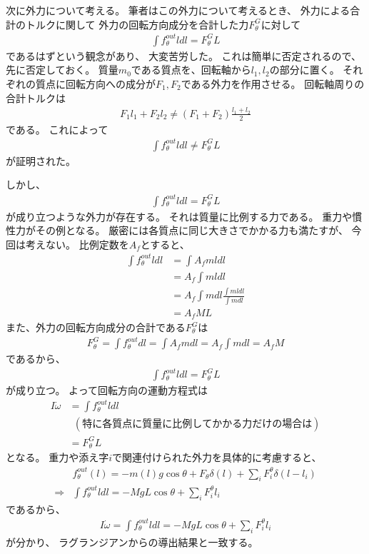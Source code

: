 \documentclass[a4paper,11pt]{jsarticle}
\begin{document}
次に外力について考える。
筆者はこの外力について考えるとき、
外力による合計のトルクに関して
外力の回転方向成分を合計した力$F_\theta^G$に対して
\begin{align}
  \int f_\theta^{out} l dl = F_\theta^G L
\end{align}
であるはずという観念があり、
大変苦労した。
これは簡単に否定されるので、
先に否定しておく。
質量$m_0$である質点を、回転軸から$l_1, l_2$の部分に置く。
それぞれの質点に回転方向への成分が$F_1, F_2$である外力を作用させる。
回転軸周りの合計トルクは
\begin{align}
  F_1 l_1 + F_2 l_2
  \neq
  (F_1 + F_2) \frac{l_1 + l_2}{2}
\end{align}
である。
これによって
\begin{align}
  \int f_\theta^{out} l dl \neq F_\theta^G L
\end{align}
が証明された。

しかし、
\begin{align}
  \int f_\theta^{out} l dl = F_\theta^G L
\end{align}
が成り立つような外力が存在する。
それは質量に比例する力である。
重力や慣性力がその例となる。
厳密には各質点に同じ大きさでかかる力も満たすが、
今回は考えない。
比例定数を$A_f$とすると、
\begin{align}
  \int f_\theta^{out} l dl
  &= \int A_f m l dl
  \\
  &= A_f \int m l dl
  \\
  &= A_f \int m dl \frac{\int mldl}{\int mdl}
  \\
  &= A_f M L
\end{align}
また、外力の回転方向成分の合計である$F_\theta^G$は
\begin{align}
  F_\theta^G
  = \int f_\theta^{out} dl
  = \int A_f m dl
  = A_f \int mdl
  = A_f M
\end{align}
であるから、
\begin{align}
  \int f_\theta^{out} l dl = F_\theta^G L
\end{align}
が成り立つ。
よって回転方向の運動方程式は
\begin{align}
  I\dot\omega 
  &= \int f_\theta^{out} l dl
  \\
  & \ \ \left( \mathrm{特に各質点に質量に比例してかかる力だけの場合は} \right)
  \\
  &= F_\theta^G L
\end{align}
となる。
重力や添え字$i$で関連付けられた外力を具体的に考慮すると、
\begin{align}
  & f_\theta^{out}(l) = -m(l)g \cos\theta + F_\theta \delta(l) + \sum_i F_i^\theta \delta( l - l_i )
  \label{eq:newton:f_theta_out_conf}
  \\
  \Rightarrow
  & \int f_\theta^{out} l dl = -MgL \cos\theta + \sum_i F_i^\theta l_i
\end{align}
であるから、
\begin{align}
  I\dot\omega 
  = \int f_\theta^{out} l dl
  = -MgL\cos\theta + \sum_i F_i^\theta l_i
  \label{eq:newton:theta_end}
\end{align}
が分かり、
ラグランジアンからの導出結果と一致する。
\end{document}
